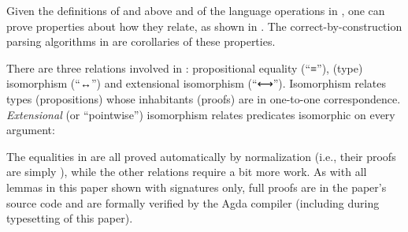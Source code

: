 \documentclass[acmsmall,screen,timestamp]{acmart}  %
\begin{document}
Given the definitions of  and  above and of the language operations in , one can prove properties about how they relate, as shown in
.
The correct-by-construction parsing algorithms in  are corollaries of these properties.

There are three relations involved in : propositional equality (``≡''), (type) isomorphism (``↔'') and extensional isomorphism (``⟷'').
Isomorphism relates types (propositions) whose inhabitants (proofs) are in one-to-one correspondence.
\emph{Extensional} (or ``pointwise'') isomorphism relates predicates isomorphic on every argument:

The equalities in  are all proved automatically by normalization (i.e., their proofs are simply ), while the other relations require a bit more work.
As with all lemmas in this paper shown with signatures only, full proofs are in the paper's source code and are formally verified by the Agda compiler (including during typesetting of this paper).


\rnc{}
\end{document}
